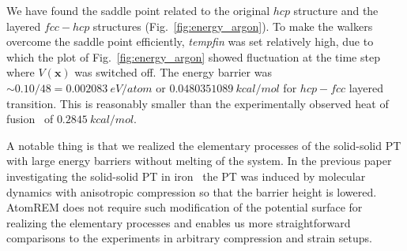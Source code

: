 \documentclass[preprint,12pt]{elsarticle}
\begin{document}



We have found the saddle point related to the original $hcp$ structure and the layered $fcc-hcp$ structures (Fig.~\ref{fig:energy_argon}). To make the walkers overcome the saddle point efficiently, {\it tempfin} was set relatively high, due to which the plot of Fig.~\ref{fig:energy_argon} showed fluctuation at the time step where $V({\bm x})$ was switched off. The energy barrier was $\sim 0.10/48=0.002083~eV/atom$ or $0.0480351089~kcal/mol$ for $hcp-fcc$ layered transition. This is reasonably smaller than the experimentally observed heat of fusion~\cite{argon_Flubacher_1961} of $0.2845~kcal/mol$.%

A notable thing is that we realized the elementary processes of the solid-solid PT with large energy barriers without melting of the system. In the previous paper investigating the solid-solid PT in iron~\cite{Iron_bcc_hcp_fcc} the PT was induced by molecular dynamics with anisotropic compression so that the barrier height is lowered. AtomREM does not require such modification of the potential surface for realizing the elementary processes and enables us more straightforward comparisons to the experiments in arbitrary compression and strain setups.

\end{document}
